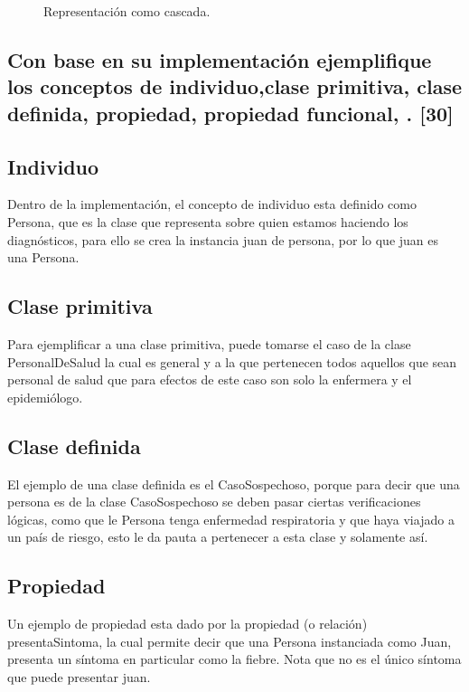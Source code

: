 \documentclass[11pt, letterpaper]{article}
\begin{document}
\begin{figure}[h!]
\begin{minipage}[t]{0.5\linewidth}
		\caption{Representación como cascada.}
		\label{fig:r2}
	\end{minipage}
\end{figure}


\newpage


\subsection{Con base en su implementación ejemplifique los conceptos de individuo,clase primitiva, clase definida, propiedad, propiedad funcional, . [30]}

\subsection{Individuo}

Dentro de la implementación, el concepto de individuo esta definido como Persona, que es la clase que representa sobre quien estamos haciendo los diagnósticos, para ello se crea la instancia juan de persona, por lo que juan es una Persona.

\subsection{Clase primitiva}

Para ejemplificar a una clase primitiva, puede tomarse el caso de la clase PersonalDeSalud la cual es general y a la que pertenecen todos aquellos que sean personal de salud que para efectos de este caso son solo la enfermera y el epidemiólogo.

\subsection{Clase definida}

El ejemplo de una clase definida es el CasoSospechoso, porque para decir que una persona es de la clase CasoSospechoso se deben pasar ciertas verificaciones lógicas, como que le Persona tenga enfermedad respiratoria y que haya viajado a un país de riesgo, esto le da pauta a pertenecer a esta clase y solamente así.

\subsection{Propiedad}

Un ejemplo de propiedad esta dado por la propiedad (o relación) presentaSintoma, la cual permite decir que una Persona instanciada como Juan, presenta un síntoma en particular como la fiebre. Nota que no es el único síntoma que puede presentar juan.
\end{document}
